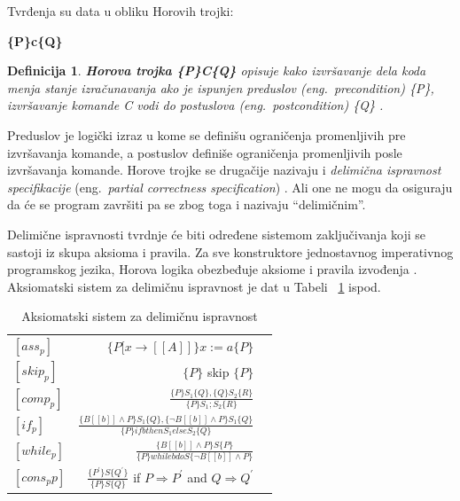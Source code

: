 \documentclass[a4paper]{article}
\newtheorem{definicija}{Definicija}[section]
\begin{document}
\begin{tcolorbox}
Tvrđenja su data u obliku Horovih trojki:

  \center \textbf{\{P\}c\{Q\}}

\end{tcolorbox}




\begin{definicija}
\textbf{Horova trojka \{P\}C\{Q\}} opisuje kako izvršavanje dela koda menja stanje izračunavanja ako je ispunjen preduslov (eng.~{\em  precondition}) \{P\}, izvršavanje komande C vodi do postuslova (eng.~{\em  postcondition}) \{Q\} \cite{milena} .

\end{definicija}

Preduslov je logički izraz u kome se definišu ograničenja promenljivih pre izvršavanja komande, a postuslov definiše ograničenja promenljivih posle izvršavanja komande.
Horove trojke se drugačije nazivaju i \textit{delimična ispravnost specifikacije } (eng.~{\em  partial correctness specification}) .
Ali one ne mogu da osiguraju da će se program završiti pa se zbog toga i nazivaju “delimičnim”.

Delimične ispravnosti tvrdnje će biti određene sistemom zaključivanja koji se sastoji iz skupa aksioma i pravila. Za sve konstruktore jednostavnog imperativnog programskog jezika, Horova logika obezbeđuje aksiome i pravila izvođenja \cite{milena}. Aksiomatski sistem za delimičnu ispravnost je dat u Tabeli ~\ref{tab:a} ispod.

\begin{table}[h]
  \caption{Aksiomatski sistem za delimičnu ispravnost}\label{tab:a}
    \begin{center}
        \begin{tabular}{lrc}\hline
        \hline
        \hline
        $[ass_{p}] $ & $ \{ P[x \rightarrow [\![A]\!]\} x:= a \{P\}$    \\  [6pt]
        $[skip_{p}] $ & $ \{P\}$ skip  $ \{P\}$   \\ [6pt]
         $[comp_{p}] $ & $  \frac{\{P\}S_1\{Q\},\{Q\}S_2\{R\}}{\{P\}S_1;S_2\{R\}} $ \\[6pt]
            $[if_{p}] $ & $  \frac{\{B[\![b]\!]\land P\}S_1\{Q\},\{\neg B[\![b]\!]\land P\}S_1\{Q\}}{\{P\} if b then S_1 else S_2\{Q\}} $ \\ [6pt]
        $[while_{p}] $ & $  \frac{\{B[\![b]\!]\land P\}S\{P\}}{\{P\} while b do S \{\neg B[\![b]\!]\land P\}} $ \\ [6pt]
          $[cons_p{p}] $ & $  \frac{\{P^{'}\}S\{Q^{'}\}}{\{P\}S\{Q\}} $ if $ P \Rightarrow	 P^{'} $ and $ Q \Rightarrow	 Q^{'} $  \\ [6pt]
          \hline \hline
        \end{tabular}
    \end{center}
\end{table}
\end{document}
